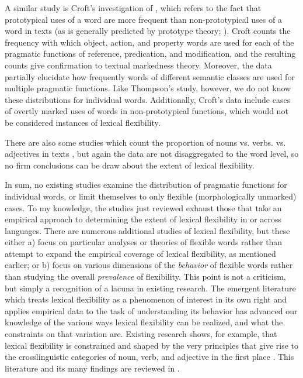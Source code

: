 A similar study is Croft's  investigation of , which refers to the fact that prototypical uses of a word are more frequent than non-prototypical uses of a word in texts (as is generally predicted by prototype theory; ). Croft counts the frequency with which object, action, and property words are used for each of the pragmatic functions of reference, predication, and modification, and the resulting counts give confirmation to textual markedness theory. Moreover, the data partially elucidate how frequently words of different semantic classes are used for multiple pragmatic functions. Like Thompson's  study, however, we do not know these distributions for individual words. Additionally, Croft's data include cases of overtly marked uses of words in non-prototypical functions, which would not be considered instances of lexical flexibility.

There are also some studies which count the proportion of nouns vs. verbs. vs. adjectives in texts , but again the data are not disaggregated to the word level, so no firm conclusions can be draw about the extent of lexical flexibility.

In sum, no existing studies examine the distribution of pragmatic functions for individual words, or limit themselves to only flexible (morphologically unmarked) cases. To my knowledge, the studies just reviewed exhaust those that take an empirical approach to determining the extent of lexical flexibility in or across languages. There are numerous additional studies of lexical flexibility, but these either a) focus on particular analyses or theories of flexible words rather than attempt to expand the empirical coverage of lexical flexibility, as mentioned earlier; or b) focus on various dimensions of the \emph{behavior} of flexible words rather than studying the overall \emph{prevalence} of flexibility. This point is not a criticism, but simply a recognition of a lacuna in existing research. The emergent literature which treats lexical flexibility as a phenomenon of interest in its own right and applies empirical data to the task of understanding its behavior has advanced our knowledge of the various ways lexical flexibility can be realized, and what the constraints on that variation are. Existing research shows, for example, that lexical flexibility is constrained and shaped by the very principles that give rise to the crosslinguistic categories of noun, verb, and adjective in the first place . This literature and its many findings are reviewed in .

